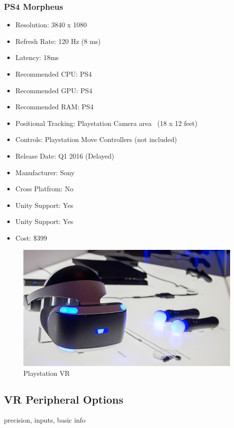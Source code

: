 \documentclass[a4paper,10pt,twoside]{article}
\begin{document}
\subsubsection{PS4 Morpheus}
\begin{itemize}
  \item Resolution: 3840 x 1080 
  \item Refresh Rate: 120 Hz (8 ms)
  \item Latency: 18ms
  \item Recommended CPU: PS4
  \item Recommended GPU: PS4
  \item Recommended RAM: PS4
  \item Positional Tracking: Playstation Camera area ~(18 x 12 feet)
  \item Controls: Playstation Move Controllers (not included)
  \item Release Date: Q1 2016 (Delayed)
  \item Manufacturer: Sony
  \item Cross Platfrom: No
    \item Unity Support: Yes
  \item Unity Support: Yes
  \item Cost: \$399
\end{itemize}
\begin{figure}[H]
	\includegraphics[width=\linewidth,height=\paperheight,keepaspectratio]{morpheus.jpg}
	\caption{Playstation VR}
	\label{fig:psvrImg}
\end{figure}
	\pagebreak
	
\pagebreak
\subsection{VR Peripheral Options}
precision, inputs, basic info
\end{document}
